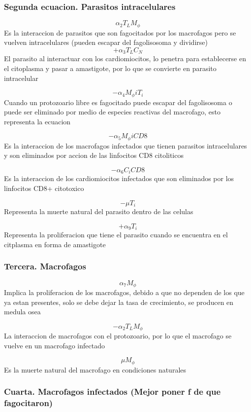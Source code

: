 \documentclass[
]{article}
\begin{document}
\hypertarget{segunda-ecuacion.-parasitos-intracelulares}{%
\subsubsection{Segunda ecuacion. Parasitos
intracelulares}\label{segunda-ecuacion.-parasitos-intracelulares}}

\[\alpha_{2}T_{L}M_{\phi} \] Es la interaccion de parasitos que son
fagocitados por los macrofagos pero se vuelven intracelulares (pueden
escapar del fagolisosoma y dividirse) \[+ \alpha_{3}T_{L}C_{N}\] El
parasito al interactuar con los cardiomiocitos, lo penetra para
establecerse en el citoplasma y pasar a amastigote, por lo que se
convierte en parasito intracelular

\[- \alpha_{4}M_{\phi}iT_{i}\] Cuando un protozoario libre es fagocitado
puede escapar del fagolisosoma o puede ser eliminado por medio de
especies reactivas del macrofago, esto representa la ecuacion

\[-\alpha_{5}M_{\phi}iCD8\] Es la interaccion de los macrofagos
infectados que tienen parasitos intracelulares y son eliminados por
accion de las linfocitos CD8 citoliticos

\[-\alpha_{6}C_{i}CD8\] Es la interaccion de los cardiomiocitos
infectados que son eliminados por los linfocitos CD8+ citotoxico

\[ - \mu T_{i} \] Representa la muerte natural del parasito dentro de
las celulas

\[+\alpha_{9}T_{i} \] Representa la proliferacion que tiene el parasito
cuando se encuentra en el citplasma en forma de amastigote

\hypertarget{tercera.-macrofagos}{%
\subsubsection{Tercera. Macrofagos}\label{tercera.-macrofagos}}

\[\alpha_{7}M_{\phi} \] Implica la proliferacion de los macrofagos,
debido a que no dependen de los que ya estan presentes, solo se debe
dejar la tasa de crecimiento, se producen en medula osea

\[-\alpha_{2}T_{L}M_{\phi}\] La interaccion de macrofagos con el
protozoario, por lo que el macrofago se vuelve en un macrofago infectado

\[\mu M_{\phi} \] Es la muerte natural del macrofago en condiciones
naturales

\hypertarget{cuarta.-macrofagos-infectados-mejor-poner-f-de-que-fagocitaron}{%
\subsubsection{Cuarta. Macrofagos infectados (Mejor poner f de que
fagocitaron)}\label{cuarta.-macrofagos-infectados-mejor-poner-f-de-que-fagocitaron}}
\end{document}
